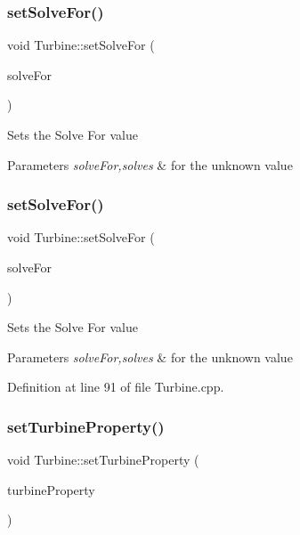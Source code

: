 \subsubsection{\texorpdfstring{set\+Solve\+For()}{setSolveFor()}\hspace{0.1cm}{\footnotesize\ttfamily [2/3]}}
{\footnotesize\ttfamily void Turbine\+::set\+Solve\+For (\begin{DoxyParamCaption}\item[{\hyperlink{class_turbine_a9fd7beba6c6f071e228fbe3e07969d2b}{Solve}}]{solve\+For }\end{DoxyParamCaption})}

Sets the Solve For value


\begin{DoxyParams}{Parameters}
{\em solve\+For,solves} & for the unknown value \\
\hline
\end{DoxyParams}
\mbox{\label{class_turbine_a96f54a8fc572dae6c5298289de890f4d}} 
\subsubsection{\texorpdfstring{set\+Solve\+For()}{setSolveFor()}\hspace{0.1cm}{\footnotesize\ttfamily [3/3]}}
{\footnotesize\ttfamily void Turbine\+::set\+Solve\+For (\begin{DoxyParamCaption}\item[{\hyperlink{class_turbine_a9fd7beba6c6f071e228fbe3e07969d2b}{Turbine\+::\+Solve}}]{solve\+For }\end{DoxyParamCaption})}

Sets the Solve For value


\begin{DoxyParams}{Parameters}
{\em solve\+For,solves} & for the unknown value \\
\hline
\end{DoxyParams}


Definition at line 91 of file Turbine.\+cpp.

\mbox{\label{class_turbine_abb3f16cefe52f4e9c7b32b2bb17a68ee}} 
\subsubsection{\texorpdfstring{set\+Turbine\+Property()}{setTurbineProperty()}\hspace{0.1cm}{\footnotesize\ttfamily [1/3]}}
{\footnotesize\ttfamily void Turbine\+::set\+Turbine\+Property (\begin{DoxyParamCaption}\item[{\hyperlink{class_turbine_a5db4f65cf2539e3837684d53221ade12}{Turbine\+::\+Turbine\+Property}}]{turbine\+Property }\end{DoxyParamCaption})}

